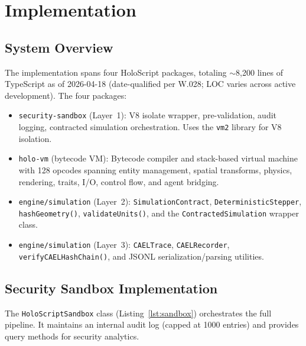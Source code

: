 \documentclass[letterpaper,twocolumn,10pt]{article}
\newcommand{\holoscript}{HoloScript}
\begin{document}

\section{Implementation}
\label{sec:impl}

\subsection{System Overview}

The implementation spans four \holoscript{} packages, totaling
$\sim$8{,}200 lines of TypeScript as of 2026-04-18 (date-qualified
per W.028; LOC varies across active development). The four packages:

\begin{itemize}[leftmargin=*,topsep=2pt,itemsep=1pt]
  \item \texttt{security-sandbox} (Layer~1): V8 isolate wrapper,
    pre-validation, audit logging, contracted simulation orchestration.
    Uses the \texttt{vm2} library for V8 isolation.
  \item \texttt{holo-vm} (bytecode VM): Bytecode compiler and
    stack-based virtual machine with 128 opcodes spanning entity
    management, spatial transforms, physics, rendering, traits, I/O,
    control flow, and agent bridging.
  \item \texttt{engine/simulation} (Layer~2): \texttt{SimulationContract},
    \texttt{DeterministicStepper}, \texttt{hashGeometry()},
    \texttt{validateUnits()}, and the \texttt{ContractedSimulation}
    wrapper class.
  \item \texttt{engine/simulation} (Layer~3): \texttt{CAELTrace},
    \texttt{CAELRecorder}, \texttt{verifyCAELHashChain()}, and
    JSONL serialization/parsing utilities.
\end{itemize}

\subsection{Security Sandbox Implementation}

The \texttt{HoloScriptSandbox} class (Listing~\ref{lst:sandbox})
orchestrates the full pipeline. It maintains an internal audit log
(capped at 1000 entries) and provides query methods for security
analytics.
\end{document}
